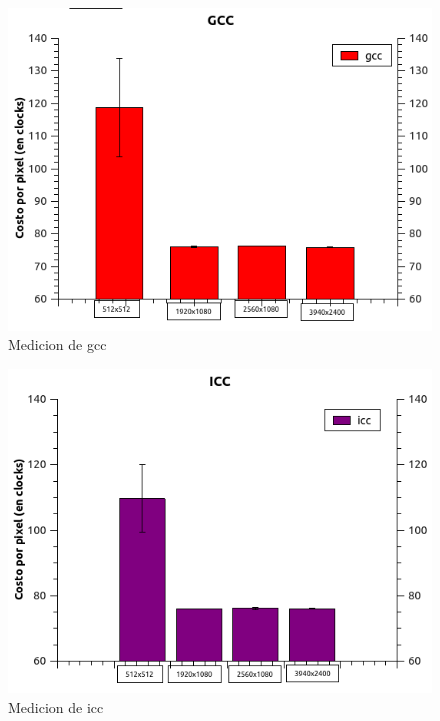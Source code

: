 \begin{figure}[H]
\begin{center}
  \includegraphics[width=\linewidth]{tiemposCompiladores/gcc.png}
  \caption{{\small Medicion de gcc}} 
\endminipage
\end{center}
\end{figure}

\begin{figure}[H]
\begin{center}
  \includegraphics[width=\linewidth]{tiemposCompiladores/icc.png}
  \caption{{\small Medicion de icc}} 
\endminipage
\end{center}
\end{figure}

